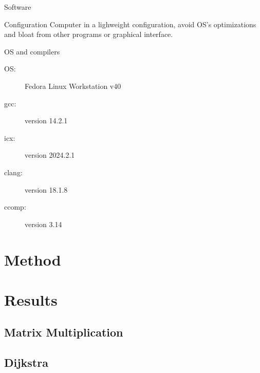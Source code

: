 \documentclass[english]{beamer}
\begin{document}
    
    \begin{frame}{Software}
        \begin{block}{Configuration}
            Computer in a lighweight configuration, avoid OS's optimizations and bloat from other programs or graphical interface.
        \end{block}
        \begin{block}{OS and compilers}
            \begin{description}
                \item[OS: ] Fedora Linux Workstation v40
                \item[gcc: ] version 14.2.1
                \item[icx: ] version 2024.2.1
                \item[clang: ] version 18.1.8
                \item[ccomp: ] version 3.14
            \end{description}
        \end{block}
    \end{frame}
    
    \section{Method}
    
    
    
    \section{Results}
    \subsection{Matrix Multiplication}
    \subsection{Dijkstra}
\end{document}
